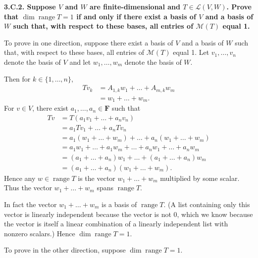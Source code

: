 \documentclass[a5paper]{article}
\begin{document}
\newcommand   \C           {\mathbf{C}}
\newcommand   \R           {\mathbf{R}}
\renewcommand \L           {\mathcal{L}}
\newcommand   \F           {\mathbf{F}}
\renewcommand \P           {\mathcal{P}}
\newcommand   \M           {\mathcal{M}}
\newcommand   \question[1] {\textbf{\boldmath#1\unboldmath}\par}
\newcommand   \op          {\operatorname}

\question{
    3.C.2.
    Suppose $V$ and $W$ are finite-dimensional and $T \in \L(V,W)$.
    Prove that $\op{dim}\op{range}T = 1$ if and only if there exist a basis of $V$ and a basis of $W$ such that, with respect to these bases, all entries of $\M(T)$ equal 1.
}

    To prove in one direction, suppose there exist a basis of $V$ and a basis of $W$ such that, with respect to these bases, all entries of $\M(T)$ equal 1.
    Let $v_1,\dots,v_n$ denote the basis of $V$ and let $w_1,\dots,w_m$ denote the basis of $W$.

    Then for $k \in \{1,\dots,n\}$,
\begin{align*}
        Tv_k &= A_{1,k}w_1 + \dots + A_{m,k}w_m  \\
             &= w_1 + \dots + w_m .
\end{align*}
    For $v \in V$, there exist $a_1,\dots,a_n \in \F$ such that
\begin{align*}
        Tv &= T(a_1v_1 + \dots + a_nv_n) \\
           &= a_1Tv_1 + \dots + a_nTv_n \\
           &= a_1(w_1 + \dots + w_m) + \dots + a_n(w_1 + \dots + w_m) \\
           &= a_1w_1 + \dots + a_1w_m + \dots + a_nw_1 + \dots + a_nw_m \\
           &= (a_1+\dots+a_n)w_1 + \dots + (a_1+\dots+a_n)w_m \\
           &= (a_1 + \dots + a_n)(w_1 + \dots + w_m) .
\end{align*}
    Hence any $w \in \op{range}T$ is the vector $w_1+\dots+w_m$ multiplied by some scalar.
    Thus the vector $w_1+\dots+w_m$ spans $\op{range}T$.

    In fact the vector $w_1+\dots+w_m$ is a basis of $\op{range}T$.
    (A list containing only this vector is linearly independent because the vector is not 0, which we know because the vector is itself a linear combination of a linearly independent list with nonzero scalars.)
    Hence $\op{dim}\op{range}T = 1$.

    To prove in the other direction, suppose $\op{dim}\op{range}T = 1$.
\end{document}
